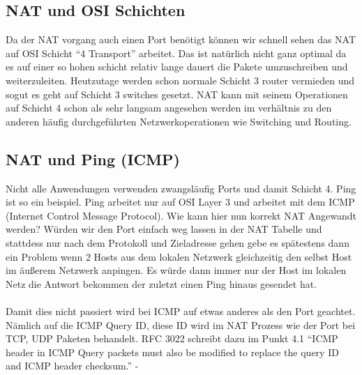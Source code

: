 \subsection{NAT und OSI Schichten}
Da der NAT vorgang auch einen Port benötigt können wir schnell sehen das NAT auf OSI Schicht “4 Transport” arbeitet. Das ist natürlich nicht ganz optimal da es auf einer so hohen schicht relativ lange dauert die Pakete umzuschreiben und weiterzuleiten. Heutzutage werden schon normale Schicht 3 router vermieden und sogut es geht auf Schicht 3 switches gesetzt. NAT kann mit seinem Operationen auf Schicht 4 schon als sehr langsam angesehen werden im verhältnis zu den anderen häufig durchgeführten Netzwerkoperationen wie Switching und Routing.

\subsection{NAT und Ping (ICMP)}
Nicht alle Anwendungen verwenden zwangsläufig Ports und damit Schicht 4. Ping ist so ein beispiel. Ping arbeitet nur auf OSI Layer 3 und arbeitet mit dem ICMP (Internet Control Message Protocol). Wie kann hier nun korrekt NAT Angewandt werden? Würden wir den Port einfach weg lassen in der NAT Tabelle und stattdess nur nach dem Protokoll und Zieladresse gehen gebe es spätestens dann ein Problem wenn 2 Hosts aus dem lokalen Netzwerk gleichzeitig den selbst Host im äußerem Netzwerk anpingen. Es würde dann immer nur der Host im lokalen Netz die Antwort bekommen der zuletzt einen Ping hinaus gesendet hat. 
\\\\
Damit dies nicht passiert wird bei ICMP auf etwas anderes als den Port geachtet. Nämlich auf die ICMP Query ID, diese ID wird im NAT Prozess wie der Port bei TCP, UDP Paketen behandelt. RFC 3022 schreibt dazu im Punkt 4.1 “ICMP header in ICMP Query packets must also be modified to replace the query ID and ICMP header checksum.” - %

